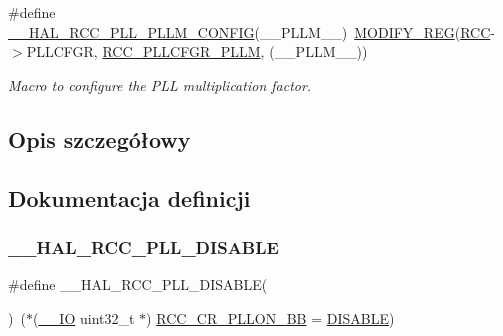 \begin{DoxyCompactItemize}
\#define \hyperlink{group___r_c_c___p_l_l___configuration_gabca62f581e6c2553cca7ef0d7a2a4b7f}{\+\_\+\+\_\+\+H\+A\+L\+\_\+\+R\+C\+C\+\_\+\+P\+L\+L\+\_\+\+P\+L\+L\+M\+\_\+\+C\+O\+N\+F\+IG}(\+\_\+\+\_\+\+P\+L\+L\+M\+\_\+\+\_\+)~\hyperlink{group___exported__macro_ga6553c99f510c3bab8cc0a91602053247}{M\+O\+D\+I\+F\+Y\+\_\+\+R\+EG}(\hyperlink{group___peripheral__declaration_ga74944438a086975793d26ae48d5882d4}{R\+CC}-\/$>$P\+L\+L\+C\+F\+GR, \hyperlink{group___peripheral___registers___bits___definition_ga9a42e8b9ee60126976d9be056e5e66b1}{R\+C\+C\+\_\+\+P\+L\+L\+C\+F\+G\+R\+\_\+\+P\+L\+LM}, (\+\_\+\+\_\+\+P\+L\+L\+M\+\_\+\+\_\+))
\begin{DoxyCompactList}\small\item\em Macro to configure the P\+LL multiplication factor. \end{DoxyCompactList}\end{DoxyCompactItemize}


\subsection{Opis szczegółowy}


\subsection{Dokumentacja definicji}
\mbox{\label{group___r_c_c___p_l_l___configuration_ga718a6afcb1492cc2796be78445a7d5ab}} 
\subsubsection{\texorpdfstring{\+\_\+\+\_\+\+H\+A\+L\+\_\+\+R\+C\+C\+\_\+\+P\+L\+L\+\_\+\+D\+I\+S\+A\+B\+LE}{\_\_HAL\_RCC\_PLL\_DISABLE}}
{\footnotesize\ttfamily \#define \+\_\+\+\_\+\+H\+A\+L\+\_\+\+R\+C\+C\+\_\+\+P\+L\+L\+\_\+\+D\+I\+S\+A\+B\+LE(\begin{DoxyParamCaption}{ }\end{DoxyParamCaption})~($\ast$(\hyperlink{core__sc300_8h_aec43007d9998a0a0e01faede4133d6be}{\+\_\+\+\_\+\+IO} uint32\+\_\+t $\ast$) \hyperlink{group___r_c_c___bit_address___alias_region_ga0b0a8f171b66cc0d767716ba23ad3c6f}{R\+C\+C\+\_\+\+C\+R\+\_\+\+P\+L\+L\+O\+N\+\_\+\+BB} = \hyperlink{group___exported__types_ggac9a7e9a35d2513ec15c3b537aaa4fba1ad3a9df141be0ccf10389b640f492b26d}{D\+I\+S\+A\+B\+LE})}



